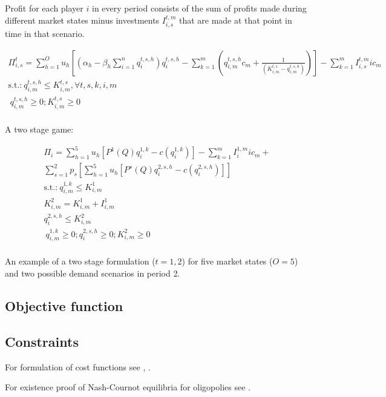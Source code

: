 Profit for each player $i$ in every period consists of the sum of profits made during different market states minus investments $I_{i,s}^{t,m}$ that are made at that point in time in that scenario.

\begin{gather}
	\Pi^t_{i,s} = \sum_{h=1}^O u_h \left[  (\alpha_h - \beta_h \sum_{i=1}^n q_i^{t,s,h}) q_i^{t,s,h} - \sum_{k=1}^{m} (q^{t,s,h}_{i,m} c_m + \frac{1}{(K^{t,s}_{i,m}-q^{t,s,h}_{i,m})}) \right] - \sum_{k=1}^{m} I_{i,s}^{t,m}  ic_m \\
\text{s.t.:} \  	q^{t,s,h}_{i,m} \leq K^{t,s}_{i,m}, \forall t,s,k,i,m \\
             \    q^{t,s,h}_{i,m} \geq 0; K^{t,s}_{i,m} \geq 0 \\
\end{gather}

A two stage game:

\begin{gather}
	\Pi_{i} = \sum_{h=1}^5 u_h \left[ P^1(Q) q^{1,k}_i-c(q^{1,k}_i) \right] - \sum_{k=1}^{m} I_{i}^{1,m}  ic_m +  \\
	\sum_{s=1}^2 p_s \left[ \sum_{h=1}^5 u_h \left[ P^s(Q) q_i^{2,s,h}- c(q_i^{2,s,h}) \right] \right] \\
\text{s.t.:} \  	q^{1,k}_{i,m} \leq K^1_{i,m} \\
									K^2_{i,m}= K^1_{i,m}+ I^1_{i,m} \\
									q_i^{2,s,h} \leq K^2_{i,m} \\
             \    q^{1,k}_{i,m} \geq 0;q_i^{2,s,h} \geq 0; K^2_{i,m} \geq 0  \\               
\end{gather}

An example of a two stage formulation ($t={1,2}$) for five market states ($O=5$) and two possible demand scenarios in period 2.



\subsection{Objective function}

\subsection{Constraints}

For formulation of cost functions see \cite{Bergman1995}, \cite{Pineau2003}.	

For existence proof of Nash-Cournot equilibria for oligopolies see \cite{Murphy1982}.



